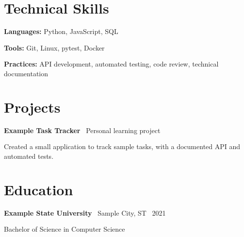 \documentclass[10pt,letterpaper]{article}
\newcommand{\skillrow}[2]{\textbf{#1:} #2\par\vspace{2.3pt}}
\begin{document}
\section{Technical Skills}
\skillrow{Languages}{Python, JavaScript, SQL}
\skillrow{Tools}{Git, Linux, pytest, Docker}
\skillrow{Practices}{API development, automated testing, code review, technical documentation}

\section{Projects}
\textbf{Example Task Tracker} \textbar\ Personal learning project\par
Created a small application to track sample tasks, with a documented API and automated tests.

\section{Education}
\textbf{Example State University} \textbar\ Sample City, ST \textbar\ 2021\par
Bachelor of Science in Computer Science
\end{document}
